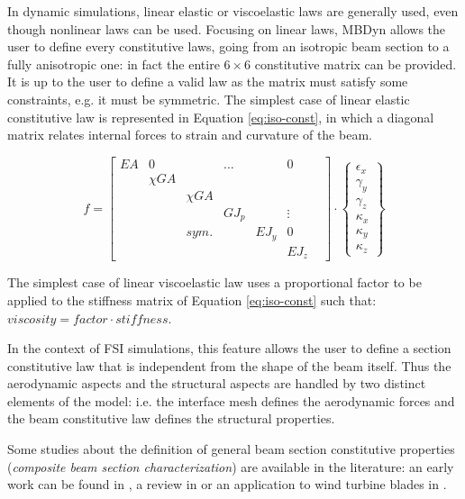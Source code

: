 In dynamic simulations, linear elastic or viscoelastic laws are generally used, even though nonlinear laws can be used.  Focusing on linear laws, MBDyn allows the user to define every constitutive laws, going from an isotropic beam section to a fully anisotropic one: in fact the entire $6 \times 6$ constitutive matrix can be provided. It is up to the user to define a valid law as the matrix must satisfy some constraints, e.g. it must be symmetric. The simplest case of linear elastic constitutive law is represented in Equation \ref{eq:iso-const}, in which a diagonal matrix relates internal forces to strain and curvature of the beam. 

\begin{equation}
    f = \begin{bmatrix} EA & 0 & & \ldots &  & 0 \\
                          & \chi GA &  & & & &  \\
                          & & \chi GA & & & \\
                          & & & GJ_p & & \vdots \\
                          & &  sym. & & EJ_y & 0 \\
                          & & & & & EJ_z
    \end{bmatrix} \cdot 
    \begin{Bmatrix}
		\epsilon_x \\ \gamma_y \\ \gamma_z \\ \kappa_x \\ \kappa_y \\ \kappa_z
	\end{Bmatrix}
    \label{eq:iso-const}
\end{equation}

The simplest case of linear viscoelastic law uses a proportional factor to be applied to the stiffness matrix of Equation \ref{eq:iso-const} such that: $viscosity=factor \cdot stiffness$.






In the context of FSI simulations, this feature allows the user to define a section constitutive law that is independent from the shape of the beam itself. Thus the aerodynamic aspects and the structural aspects are handled by two distinct elements of the model: i.e. the interface mesh defines the aerodynamic forces and the beam constitutive law defines the structural properties.   

Some studies about the definition of general beam section constitutive properties (\textit{composite beam section characterization}) are available in the literature: an early work can be found in \cite{giavotto1983anisotropic}, a review in \cite{hodges1990review} or an application to wind turbine blades in \cite{kim2013development}.


